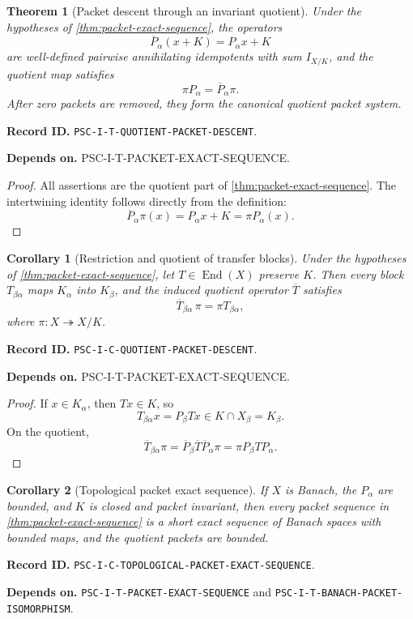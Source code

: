 \documentclass[11pt]{article}
\newtheorem{theorem}{Theorem}[section]
\newtheorem{corollary}[corollary]{Corollary}
\theoremstyle{definition}
\theoremstyle{remark}
\newcommand{\End}{\operatorname{End}}
\newcommand{\RecordID}[1]{\par\smallskip\noindent\begingroup\footnotesize\color{PSCGray}\raggedright\textbf{Record ID.} \nolinkurl{#1}.\par\endgroup}
\newcommand{\Depends}[1]{\par\noindent\begingroup\footnotesize\color{PSCGray}\raggedright\textbf{Depends on.} #1\par\endgroup}
\begin{document}
\begin{theorem}[Packet descent through an invariant quotient]
\label{thm:quotient-packet-descent}
Under the hypotheses of \cref{thm:packet-exact-sequence}, the operators
\[
\overline P_\alpha(x+K)=P_\alpha x+K
\]
are well-defined pairwise annihilating idempotents with sum $I_{X/K}$, and the quotient map satisfies
\[
\boxed{\pi P_\alpha=\overline P_\alpha\pi.}
\]
After zero packets are removed, they form the canonical quotient packet system.
\end{theorem}
\RecordID{PSC-I-T-QUOTIENT-PACKET-DESCENT}
\Depends{PSC-I-T-PACKET-EXACT-SEQUENCE.}

\begin{proof}
All assertions are the quotient part of \cref{thm:packet-exact-sequence}.  The intertwining identity follows directly from the definition:
\[
\overline P_\alpha\pi(x)=P_\alpha x+K=\pi P_\alpha(x).
\]
\end{proof}

\begin{corollary}[Restriction and quotient of transfer blocks]
\label{cor:block-descent}
Under the hypotheses of \cref{thm:packet-exact-sequence}, let $T\in\End(X)$ preserve $K$.  Then every block $T_{\beta\alpha}$ maps $K_\alpha$ into $K_\beta$, and the induced quotient operator $\overline T$ satisfies
\[
\boxed{
\overline T_{\beta\alpha}\,\pi
=
\pi T_{\beta\alpha},
}
\]
where $\pi:X\twoheadrightarrow X/K$.
\end{corollary}
\RecordID{PSC-I-C-QUOTIENT-PACKET-DESCENT}
\Depends{PSC-I-T-PACKET-EXACT-SEQUENCE.}

\begin{proof}
If $x\in K_\alpha$, then $Tx\in K$, so
\[
T_{\beta\alpha}x=P_\beta Tx\in K\cap X_\beta=K_\beta.
\]
On the quotient,
\[
\overline T_{\beta\alpha}\pi
=
\overline P_\beta\overline T\overline P_\alpha\pi
=
\pi P_\beta TP_\alpha.
\]
\end{proof}

\begin{corollary}[Topological packet exact sequence]
\label{cor:topological-packet-exact-sequence}
If $X$ is Banach, the $P_\alpha$ are bounded, and $K$ is closed and packet invariant, then every packet sequence in \cref{thm:packet-exact-sequence} is a short exact sequence of Banach spaces with bounded maps, and the quotient packets are bounded.
\end{corollary}
\RecordID{PSC-I-C-TOPOLOGICAL-PACKET-EXACT-SEQUENCE}
\Depends{\nolinkurl{PSC-I-T-PACKET-EXACT-SEQUENCE} and
\nolinkurl{PSC-I-T-BANACH-PACKET-ISOMORPHISM}.}
\end{document}
